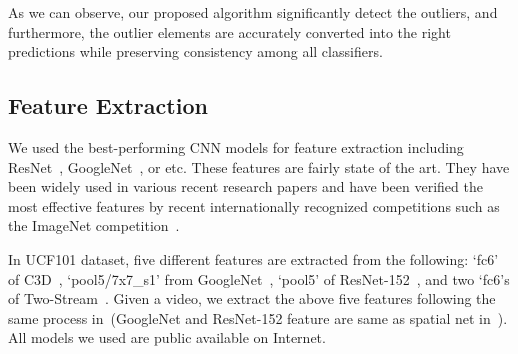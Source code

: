 \documentclass[10pt,twocolumn,letterpaper]{article}
\begin{document}
As we can observe, our proposed algorithm significantly detect the outliers,
and furthermore, the outlier elements are accurately converted into the right predictions while preserving consistency among all classifiers.




\subsection{Feature Extraction}
We used the best-performing CNN models for feature extraction including ResNet~\cite{he2015deep}, GoogleNet~\cite{szegedy2015going}, or etc.
These features are fairly state of the art.
They have been widely used in various recent research papers and have been verified the most effective features by recent internationally recognized competitions such as the ImageNet competition~\cite{russakovsky2015imagenet}.


In UCF101 dataset, five different features are extracted from the following:
`fc6' of C3D~\cite{tran2015learning},
`pool5/7x7\_s1' from GoogleNet~\cite{szegedy2015going},
`pool5' of ResNet-152~\cite{he2015deep},
and two `fc6's of Two-Stream~\cite{simonyan2014two}.
Given a video, we extract the above five features following the same process in~\cite{simonyan2014two,tran2015learning}(GoogleNet and ResNet-152 feature are same as spatial net in~\cite{simonyan2014two}).
All models we used are public available on Internet. %
\end{document}
